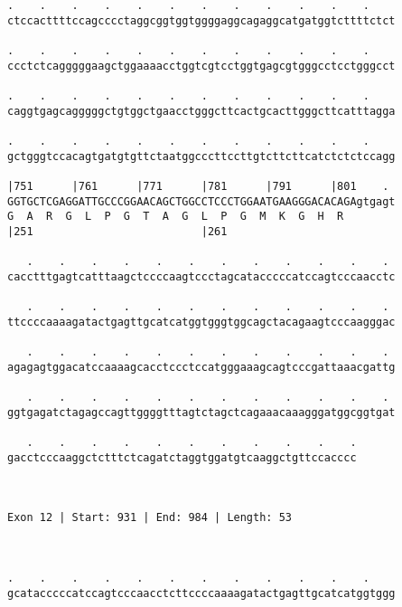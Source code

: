 \documentclass{article}
\begin{document}
\begin{Verbatim}
.    .    .    .    .    .    .    .    .    .    .    .    
ctccacttttccagcccctaggcggtggtggggaggcagaggcatgatggtcttttctct
                                                            
.    .    .    .    .    .    .    .    .    .    .    .    
ccctctcagggggaagctggaaaacctggtcgtcctggtgagcgtgggcctcctgggcct
                                                            
.    .    .    .    .    .    .    .    .    .    .    .    
caggtgagcagggggctgtggctgaacctgggcttcactgcacttgggcttcatttagga
                                                            
.    .    .    .    .    .    .    .    .    .    .    .    
gctgggtccacagtgatgtgttctaatggcccttccttgtcttcttcatctctctccagg
                                                            
|751      |761      |771      |781      |791      |801    . 
GGTGCTCGAGGATTGCCCGGAACAGCTGGCCTCCCTGGAATGAAGGGACACAGAgtgagt
G  A  R  G  L  P  G  T  A  G  L  P  G  M  K  G  H  R        
|251                          |261                          
  
   .    .    .    .    .    .    .    .    .    .    .    . 
cacctttgagtcatttaagctccccaagtccctagcatacccccatccagtcccaacctc
                                                            
   .    .    .    .    .    .    .    .    .    .    .    . 
ttccccaaaagatactgagttgcatcatggtgggtggcagctacagaagtcccaagggac
                                                            
   .    .    .    .    .    .    .    .    .    .    .    . 
agagagtggacatccaaaagcacctccctccatgggaaagcagtcccgattaaacgattg
                                                            
   .    .    .    .    .    .    .    .    .    .    .    . 
ggtgagatctagagccagttggggtttagtctagctcagaaacaaagggatggcggtgat
                                                            
   .    .    .    .    .    .    .    .    .    .    .
gacctcccaaggctctttctcagatctaggtggatgtcaaggctgttccacccc
                                                      
                                                      
 
Exon 12 | Start: 931 | End: 984 | Length: 53



.    .    .    .    .    .    .    .    .    .    .    .    
gcatacccccatccagtcccaacctcttccccaaaagatactgagttgcatcatggtggg
                                                            

\end{Verbatim}
\end{document}
